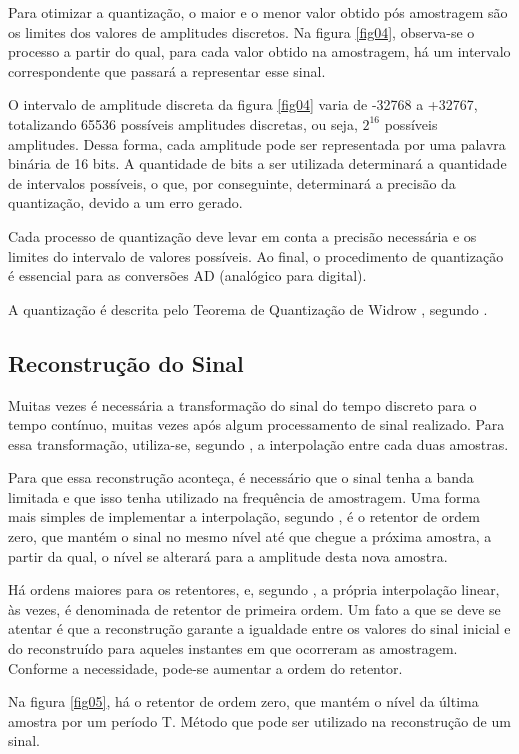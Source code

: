 Para otimizar a quantização, o maior e o menor valor obtido pós amostragem são os limites dos valores de amplitudes discretos. Na figura \ref{fig04}, observa-se o processo a partir do qual, para cada valor obtido na amostragem, há um intervalo correspondente que passará a representar esse sinal. \par O intervalo de amplitude discreta da figura \ref{fig04} varia de -32768 a +32767, totalizando 65536 possíveis amplitudes discretas, ou seja, $2^{16}$ possíveis amplitudes. Dessa forma, cada amplitude pode ser representada por uma palavra binária de 16 bits. A quantidade de bits a ser utilizada determinará a quantidade de intervalos possíveis, o que, por conseguinte, determinará a precisão da quantização, devido a um erro gerado.\par Cada processo de quantização deve levar em conta a precisão necessária e os limites do intervalo de valores possíveis. Ao final, o procedimento de quantização é essencial para as conversões AD (analógico para digital).

A quantização é descrita pelo Teorema de Quantização de Widrow \cite{widrow}, segundo \cite{zolzer2008digital}.

\subsection{Reconstrução do Sinal}
Muitas vezes é necessária a transformação do sinal do tempo discreto para o tempo contínuo, muitas vezes após algum processamento de sinal realizado. Para essa transformação, utiliza-se, segundo \cite{oppenheim2010sinais}, a interpolação entre cada duas amostras. \par Para que essa reconstrução aconteça, é necessário que o sinal tenha a banda limitada e que isso tenha utilizado na frequência de amostragem. Uma forma mais simples de implementar a interpolação, segundo \cite{oppenheim2010sinais}, é o retentor de ordem zero, que mantém o sinal no mesmo nível até que chegue a próxima amostra, a partir da qual, o nível se alterará para a amplitude desta nova amostra. \par Há ordens maiores para os retentores, e, segundo \cite{oppenheim2010sinais}, a própria interpolação linear, às vezes, é denominada de retentor de primeira ordem. Um fato a que se deve se atentar é que a reconstrução garante a igualdade entre os valores do sinal inicial e do reconstruído para aqueles instantes em que ocorreram as amostragem.  Conforme a necessidade, pode-se aumentar a ordem do retentor.
\par Na figura \ref{fig05}, há o retentor de ordem zero, que mantém o nível da última amostra por um período T. Método que pode ser utilizado na reconstrução de um sinal.

